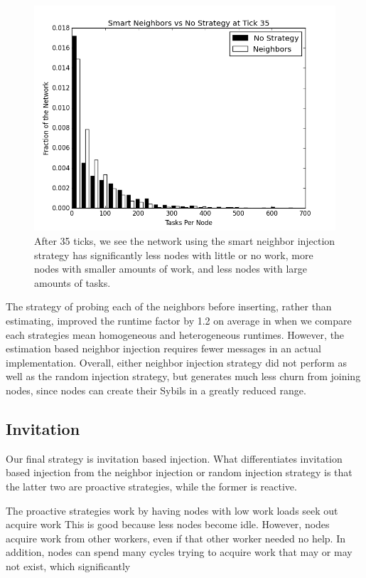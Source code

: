 \begin{figure}
	\centering
	\includegraphics[width=0.7\linewidth]{figs/neighborsStableSmartHist35}
	\caption[Smart Neighbor injection  vs no strategy after 35 ticks.]{After 35 ticks, we see the network using the smart neighbor injection strategy has significantly less nodes with little or no work, more nodes with smaller amounts of work, and less nodes with large amounts of tasks.}
	\label{fig:neighborsStableSmartHist35}
\end{figure}



The strategy of probing each of the neighbors before inserting, rather than estimating, improved the runtime factor by 1.2  on average in when we compare each strategies mean homogeneous and heterogeneous runtimes.
However, the estimation based neighbor injection requires fewer messages in an actual implementation.
Overall, either neighbor injection strategy did not perform as well as the random injection strategy, but generates much less churn from joining nodes, since nodes can create their Sybils in a greatly reduced range.
\subsection{Invitation}
Our final strategy is invitation based injection.
What differentiates invitation based injection from the neighbor injection or random injection strategy is that the latter two are proactive strategies, while the former is reactive.

The proactive strategies work by having nodes with low work loads seek out acquire work 
This is good because less nodes become idle.
However, nodes acquire work from other workers, even if that other worker needed no help.
In addition, nodes can spend many cycles trying to acquire work that may or may not exist, which significantly 


